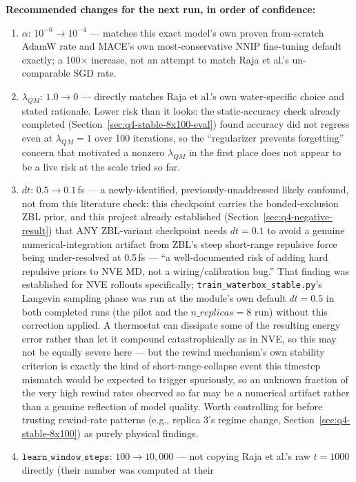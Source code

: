 \documentclass[11pt]{article}
\begin{document}
\textbf{Recommended changes for the next run, in order of confidence:}
\begin{enumerate}
  \item $\alpha$: $10^{-6}\to10^{-4}$ --- matches this exact model's own
  proven from-scratch AdamW rate and MACE's own most-conservative NNIP
  fine-tuning default exactly; a 100$\times$ increase, not an attempt to
  match Raja et al.'s un-comparable SGD rate.
  \item $\lambda_{QM}$: $1.0\to0$ --- directly matches Raja et al.'s own
  water-specific choice and stated rationale. Lower risk than it looks: the
  static-accuracy check already completed
  (Section~\ref{sec:q4-stable-8x100-eval}) found accuracy did not regress
  even at $\lambda_{QM}=1$ over 100 iterations, so the ``regularizer
  prevents forgetting'' concern that motivated a nonzero $\lambda_{QM}$ in
  the first place does not appear to be a live risk at the scale tried so
  far.
  \item $dt$: $0.5\to0.1$\,fs --- a newly-identified, previously-unaddressed
  likely confound, not from this literature check: this checkpoint carries
  the bonded-exclusion ZBL prior, and this project already established
  (Section~\ref{sec:q4-negative-result}) that ANY ZBL-variant checkpoint
  needs $dt=0.1$ to avoid a genuine numerical-integration artifact from
  ZBL's steep short-range repulsive force being under-resolved at 0.5\,fs
  --- ``a well-documented risk of adding hard repulsive priors to NVE MD,
  not a wiring/calibration bug.'' That finding was established for NVE
  rollouts specifically; \texttt{train\_waterbox\_stable.py}'s Langevin
  sampling phase was run at the module's own default $dt=0.5$ in both
  completed runs (the pilot and the $n\_replicas=8$ run) without this
  correction applied. A thermostat can dissipate some of the resulting
  energy error rather than let it compound catastrophically as in NVE, so
  this may not be equally severe here --- but the rewind mechanism's own
  stability criterion is exactly the kind of short-range-collapse event this
  timestep mismatch would be expected to trigger spuriously, so an unknown
  fraction of the very high rewind rates observed so far may be a numerical
  artifact rather than a genuine reflection of model quality. Worth
  controlling for before trusting rewind-rate patterns (e.g., replica 3's
  regime change, Section~\ref{sec:q4-stable-8x100}) as purely physical
  findings.
  \item $\texttt{learn\_window\_steps}$: $100\to10{,}000$ --- not copying
  Raja et al.'s raw $t=1000$ directly (their number was computed at their

\end{enumerate}
\end{document}
